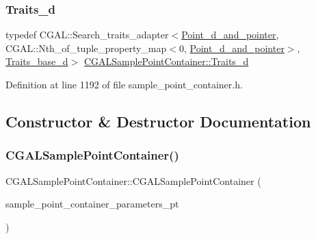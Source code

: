 \mbox{\label{classCGALSamplePointContainer_abf3c9b2e8768b34dc1700c1f0d4ea342}} 
\subsubsection{\texorpdfstring{Traits\+\_\+d}{Traits\_d}}
{\footnotesize\ttfamily typedef C\+G\+A\+L\+::\+Search\+\_\+traits\+\_\+adapter$<$\hyperlink{classCGALSamplePointContainer_a9fd65260284f24b79526a9db5fb55a3b}{Point\+\_\+d\+\_\+and\+\_\+pointer}, C\+G\+A\+L\+::\+Nth\+\_\+of\+\_\+tuple\+\_\+property\+\_\+map$<$0, \hyperlink{classCGALSamplePointContainer_a9fd65260284f24b79526a9db5fb55a3b}{Point\+\_\+d\+\_\+and\+\_\+pointer}$>$, \hyperlink{classCGALSamplePointContainer_ad22aa447b0cd9cfa0d92669b2d939dcc}{Traits\+\_\+base\+\_\+d}$>$ \hyperlink{classCGALSamplePointContainer_abf3c9b2e8768b34dc1700c1f0d4ea342}{C\+G\+A\+L\+Sample\+Point\+Container\+::\+Traits\+\_\+d}\hspace{0.3cm}{\ttfamily [private]}}



Definition at line 1192 of file sample\+\_\+point\+\_\+container.\+h.



\subsection{Constructor \& Destructor Documentation}
\mbox{\label{classCGALSamplePointContainer_a3b81406803832597ce1dcb93d3383e9e}} 
\subsubsection{\texorpdfstring{C\+G\+A\+L\+Sample\+Point\+Container()}{CGALSamplePointContainer()}\hspace{0.1cm}{\footnotesize\ttfamily [1/2]}}
{\footnotesize\ttfamily C\+G\+A\+L\+Sample\+Point\+Container\+::\+C\+G\+A\+L\+Sample\+Point\+Container (\begin{DoxyParamCaption}\item[{Sample\+Point\+Container\+Parameters $\ast$}]{sample\+\_\+point\+\_\+container\+\_\+parameters\+\_\+pt }\end{DoxyParamCaption})}



